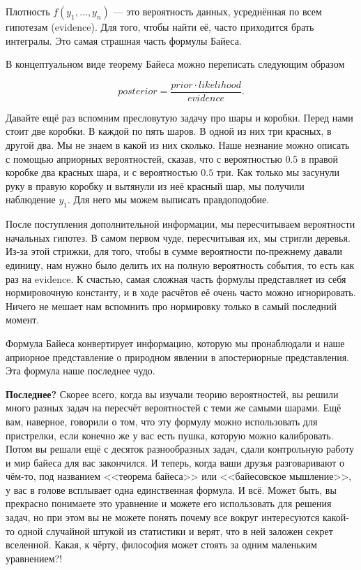 Плотность $f(y_1, \ldots, y_n)$ --- это вероятность данных, усреднённая по всем гипотезам (evidence).  Для того, чтобы найти её, часто приходится брать интегралы. Это самая страшная часть формулы Байеса. 

В концептуальном виде теорему Байеса можно переписать следующим образом

\[ 
posterior = \frac{prior \cdot likelihood}{evidence}.
\]

Давайте ещё раз вспомним пресловутую задачу про шары и коробки.  Перед нами стоит две коробки. В каждой по пять шаров. В одной из них три красных, в другой два. Мы не знаем в какой из них сколько. Наше незнание можно описать с помощью априорных вероятностей, сказав, что с вероятностью $0.5$ в правой коробке два красных шара, и с вероятностью $0.5$ три.  Как только мы засунули руку в правую коробку и вытянули из неё красный шар, мы получили наблюдение $y_1$. Для него мы можем выписать правдоподобие. 

После поступления дополнительной информации, мы пересчитываем вероятности начальных гипотез. В самом первом чуде, пересчитывая их, мы стригли деревья. Из-за этой стрижки, для того, чтобы в сумме вероятности по-прежнему давали единицу, нам нужно было делить их на полную вероятность события, то есть как раз на evidence. К счастью, самая сложная часть формулы представляет из себя нормировочную константу, и в ходе расчётов её очень часто можно игнорировать. Ничего не мешает нам вспомнить про нормировку только в самый последний момент.

Формула Байеса конвертирует информацию, которую мы пронаблюдали и наше априорное представление о природном явлении в апостериорные представления. Эта формула наше последнее чудо.  

\textbf{Последнее?} Скорее всего, когда вы изучали теорию вероятностей, вы решили много разных задач на пересчёт вероятностей с теми же самыми шарами. Ещё вам, наверное, говорили о том, что эту формулу можно использовать для пристрелки,  если конечно же у вас есть пушка, которую можно калибровать. Потом вы решали ещё с десяток разнообразных задач, сдали контрольную работу и мир байеса для вас закончился. И теперь, когда ваши друзья разговаривают о чём-то, под названием <<теорема байеса>> или <<байесовское мышление>>, у вас в голове всплывает одна единственная формула. И всё. Может быть, вы прекрасно понимаете это уравнение и можете его использовать для решения задач, но при этом вы не можете понять почему все вокруг интересуются какой-то одной случайной штукой из статистики и верят, что в ней заложен секрет вселенной. Какая, к чёрту, философия может стоять за одним маленьким уравнением?!

